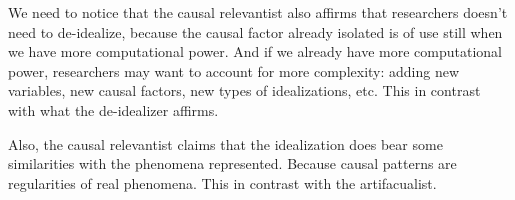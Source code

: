 We need to notice that the causal relevantist also affirms that researchers doesn't need to de-idealize, because the causal factor already isolated is of use still when we have more computational power.
And if we already have more computational power, researchers may want to account for more complexity: adding new variables, new causal factors, new types of idealizations, etc.
This in contrast with what the de-idealizer affirms.

Also, the causal relevantist claims that the idealization does bear some similarities with the phenomena represented.
Because causal patterns are regularities of real phenomena.
This in contrast with the artifacualist.


